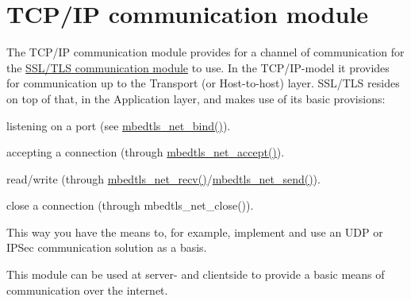 \hypertarget{group__tcpip__communication__module}{\section{T\-C\-P/\-I\-P communication module}
\label{group__tcpip__communication__module}
}
The T\-C\-P/\-I\-P communication module provides for a channel of communication for the \hyperlink{group__ssltls__communication__module}{S\-S\-L/\-T\-L\-S communication module} to use. In the T\-C\-P/\-I\-P-\/model it provides for communication up to the Transport (or Host-\/to-\/host) layer. S\-S\-L/\-T\-L\-S resides on top of that, in the Application layer, and makes use of its basic provisions\-:
\begin{DoxyItemize}
\item listening on a port (see {\ttfamily \hyperlink{net_8h_aa1cb7fc819153c43a2c75c95d0152c75}{mbedtls\-\_\-net\-\_\-bind()}}).
\item accepting a connection (through {\ttfamily \hyperlink{net_8h_a2f862b9086f3466593d5cf399b2c98c6}{mbedtls\-\_\-net\-\_\-accept()}}).
\item read/write (through {\ttfamily \hyperlink{net_8h_a03af351ec420bbeb5e91357abcfb3663}{mbedtls\-\_\-net\-\_\-recv()}/{\ttfamily \hyperlink{net_8h_a4841afd0e14f1fd44b82c3a850961ab7}{mbedtls\-\_\-net\-\_\-send()}})}.
\item close a connection (through {\ttfamily mbedtls\-\_\-net\-\_\-close()}).
\end{DoxyItemize}

This way you have the means to, for example, implement and use an U\-D\-P or I\-P\-Sec communication solution as a basis.

This module can be used at server-\/ and clientside to provide a basic means of communication over the internet. 